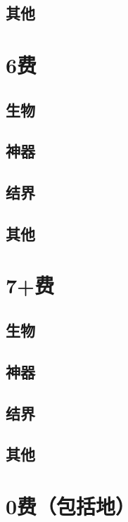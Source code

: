 \documentclass[lang = cn, color = black, 10pt]{AllThatStax}
\begin{document}
\section{其他}

\chapter{6费}

\section{生物}

\section{神器}

\section{结界}

\section{其他}

\chapter{7+费}

\section{生物}

\section{神器}

\section{结界}

\section{其他}

\chapter{0费（包括地）}
\end{document}
